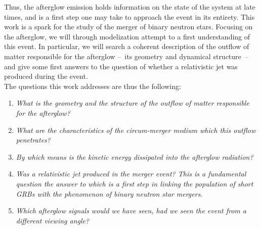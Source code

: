 Thus, the afterglow emission holds information on the state of the system at late times, and is a first step one may take to approach the event in its entirety. This work is a spark for the study of the merger of binary neutron stars. Focusing on the afterglow, we will through modelization attempt to a first understanding of this event. In particular, we will search a coherent description of the outflow of matter responsible for the afterglow --~its geometry and dynamical structure~-- and give some first answers to the question of whether a relativistic jet was produced during the event.\\

The questions this work addresses are thus the following:

\begin{enumerate}
	\item \it{What is the geometry and the structure of the outflow of matter responsible for the afterglow?}
	\item \it{What are the characteristics of the circum-merger medium which this outflow penetrates?}
	\item \it{By which means is the kinetic energy dissipated into the afterglow radiation?}
	\item \it{Was a relativistic jet produced in the merger event?} This is a fundamental question the answer to which is a first step in linking the population of short GRBs with the phenomenon of binary neutron star mergers.
	\item \it{Which afterglow signals would we have seen, had we seen the event from a different viewing angle?}
\end{enumerate}

